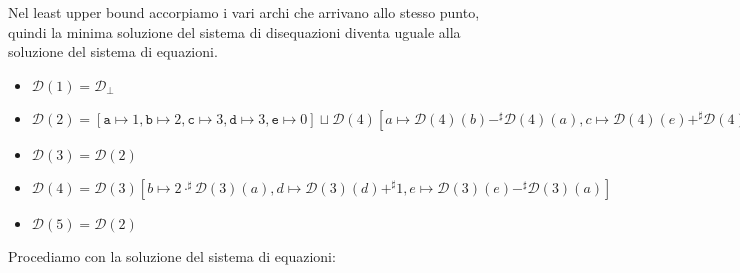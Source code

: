 Nel least upper bound accorpiamo i vari archi che arrivano allo stesso punto, quindi 
la minima soluzione del sistema di disequazioni diventa uguale alla soluzione del
sistema di equazioni.
\begin{itemize}
    \item $ \mathcal{D}(1) = \mathcal{D}_\bot$
    \item $ \mathcal{D}(2) = [\texttt{a} \mapsto 1, \texttt{b} 
    \mapsto 2, \texttt{c} \mapsto 3, \texttt{d} \mapsto 3, \texttt{e} \mapsto 0] 
    \sqcup \mathcal{D}(4)[a \mapsto \mathcal{D}(4)(b) -^{\sharp} \mathcal{D}(4)(a), 
    c \mapsto \mathcal{D}(4)(e) +^{\sharp} \mathcal{D}(4)(d)]$
    \item $ \mathcal{D}(3) = \mathcal{D}(2)$
    \item $ \mathcal{D}(4) = \mathcal{D}(3)[b \mapsto 2 \cdot^{\sharp} 
    \mathcal{D}(3)(a), d \mapsto \mathcal{D}(3)(d) +^{\sharp} 1, 
    e \mapsto \mathcal{D}(3)(e) -^{\sharp} \mathcal{D}(3)(a)]$
    \item $ \mathcal{D}(5) = \mathcal{D}(2)$
\end{itemize} 
Procediamo con la soluzione del sistema di equazioni:
